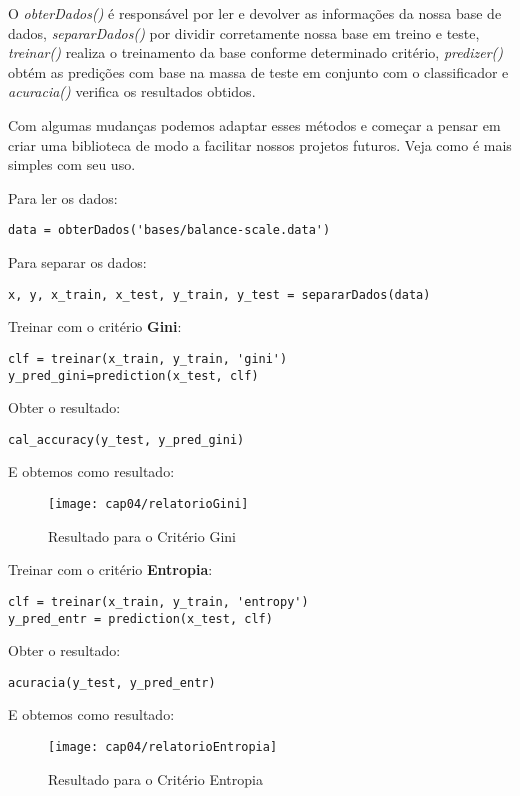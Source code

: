 O \textit{obterDados()} é responsável por ler e devolver as informações da nossa base de dados, \textit{separarDados()} por dividir corretamente nossa base em treino e teste, \textit{treinar()} realiza o treinamento da base conforme determinado critério, \textit{predizer()} obtém as predições com base na massa de teste em conjunto com o classificador e \textit{acuracia()} verifica os resultados obtidos.

Com algumas mudanças podemos adaptar esses métodos e começar a pensar em criar uma biblioteca de modo a facilitar nossos projetos futuros. Veja como é mais simples com seu uso.

Para ler os dados:
\begin{lstlisting}[]
data = obterDados('bases/balance-scale.data')
\end{lstlisting}

Para separar os dados:
\begin{lstlisting}[]
x, y, x_train, x_test, y_train, y_test = separarDados(data)
\end{lstlisting}

Treinar com o critério \textbf{Gini}:
\begin{lstlisting}[]
clf = treinar(x_train, y_train, 'gini')
y_pred_gini=prediction(x_test, clf)
\end{lstlisting}

Obter o resultado:
\begin{lstlisting}[]
cal_accuracy(y_test, y_pred_gini)
\end{lstlisting}

E obtemos como resultado:
\begin{figure}[H]
	\centering
	\texttt{[image: cap04/relatorioGini]}
	\caption{Resultado para o Critério Gini}
\end{figure}

Treinar com o critério \textbf{Entropia}:
\begin{lstlisting}[]
clf = treinar(x_train, y_train, 'entropy')
y_pred_entr = prediction(x_test, clf)
\end{lstlisting}

Obter o resultado:
\begin{lstlisting}[]
acuracia(y_test, y_pred_entr)
\end{lstlisting}

E obtemos como resultado:
\begin{figure}[H]
	\centering
	\texttt{[image: cap04/relatorioEntropia]}
	\caption{Resultado para o Critério Entropia}
\end{figure}

